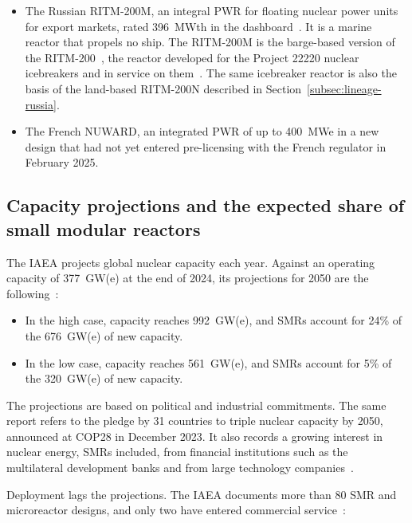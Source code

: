 \begin{itemize}
  \item The Russian RITM-200M, an integral PWR for floating nuclear
        power units for export markets, rated 396~MWth in the
        dashboard~\cite{nea_dashboard_2025}. It is a marine reactor that
        propels no ship. The RITM-200M is the barge-based version of the
        RITM-200~\cite{wna_ships}, the reactor developed for the Project
        22220 nuclear icebreakers and in service on
        them~\cite{ritm200n_nei_2024}. The same icebreaker reactor is also
        the basis of the land-based RITM-200N described in
        Section~\ref{subsec:lineage-russia}.

  \item The French NUWARD, an integrated PWR of up to 400~MWe in a new
        design that had not yet entered pre-licensing with the French
        regulator in February 2025.
\end{itemize}

\subsection{Capacity projections and the expected share of small modular reactors}
\label{subsec:why-now}

The IAEA projects global nuclear capacity each year. Against an
operating capacity of 377~GW(e) at the end of 2024, its projections for
2050 are the following~\cite{iaea_rds1_2025}:

\begin{itemize}
  \item In the high case, capacity reaches 992~GW(e), and SMRs account
        for 24\% of the 676~GW(e) of new capacity.

  \item In the low case, capacity reaches 561~GW(e), and SMRs account
        for 5\% of the 320~GW(e) of new capacity.
\end{itemize}

The projections are based on political and industrial commitments. The same
report refers to the pledge by 31 countries to triple nuclear capacity
by 2050, announced at COP28 in December 2023. It also records a growing
interest in nuclear energy, SMRs included, from financial institutions
such as the multilateral development banks and from large technology
companies~\cite{iaea_rds1_2025}.

Deployment lags the projections. The IAEA documents more than 80 SMR
and microreactor designs, and only two have entered commercial
service~\cite{worldnuclearreport_smr}:

